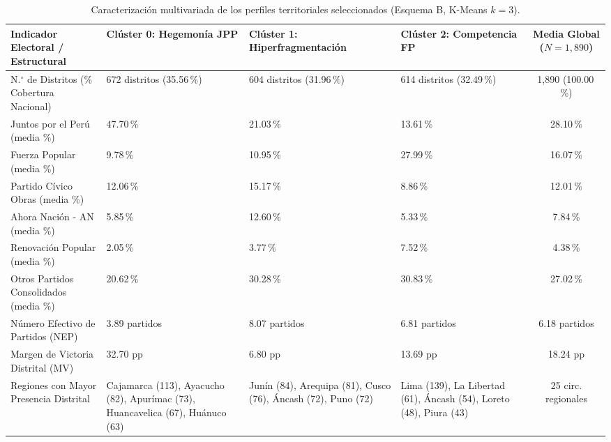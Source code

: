\documentclass[conference,10pt,letterpaper]{IEEEtran}
\begin{document}
\begin{table}[t]
\centering
\caption{Caracterización multivariada de los perfiles territoriales seleccionados (Esquema B, K-Means $k = 3$).}
\label{tab:perfiles}
\footnotesize
\begin{tabularx}{\textwidth}{@{} p{4.2cm} X X X c @{}}
\toprule
\textbf{Indicador Electoral / Estructural} & \textbf{Clúster 0: Hegemonía JPP} & \textbf{Clúster 1: Hiperfragmentación} & \textbf{Clúster 2: Competencia FP} & \textbf{Media Global ($N = 1,890$)} \\
\midrule
N.$^\circ$ de Distritos (\% Cobertura Nacional) & 672 distritos (35.56\,\%) & 604 distritos (31.96\,\%) & 614 distritos (32.49\,\%) & 1,890 (100.00\,\%) \\
Juntos por el Perú (media \%) & 47.70\,\% & 21.03\,\% & 13.61\,\% & 28.10\,\% \\
Fuerza Popular (media \%) & 9.78\,\% & 10.95\,\% & 27.99\,\% & 16.07\,\% \\
Partido Cívico Obras (media \%) & 12.06\,\% & 15.17\,\% & 8.86\,\% & 12.01\,\% \\
Ahora Nación - AN (media \%) & 5.85\,\% & 12.60\,\% & 5.33\,\% & 7.84\,\% \\
Renovación Popular (media \%) & 2.05\,\% & 3.77\,\% & 7.52\,\% & 4.38\,\% \\
Otros Partidos Consolidados (media \%) & 20.62\,\% & 30.28\,\% & 30.83\,\% & 27.02\,\% \\
Número Efectivo de Partidos (NEP) & 3.89 partidos & 8.07 partidos & 6.81 partidos & 6.18 partidos \\
Margen de Victoria Distrital (MV) & 32.70 pp & 6.80 pp & 13.69 pp & 18.24 pp \\
Regiones con Mayor Presencia Distrital & Cajamarca (113), Ayacucho (82), Apurímac (73), Huancavelica (67), Huánuco (63) & Junín (84), Arequipa (81), Cusco (76), Áncash (72), Puno (72) & Lima (139), La Libertad (61), Áncash (54), Loreto (48), Piura (43) & 25 circ. regionales \\
\bottomrule
\end{tabularx}
\end{table}
\end{document}
